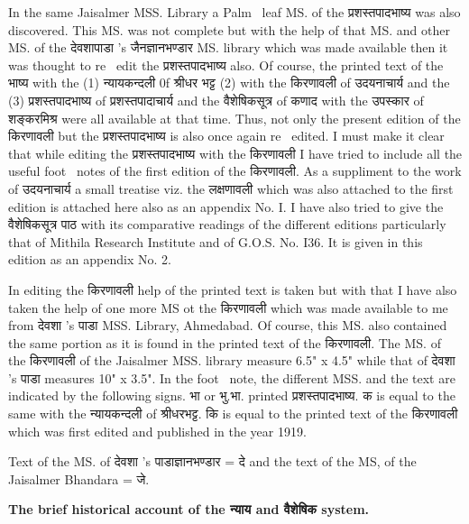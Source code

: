 \documentclass[11pt, openany]{book}
\begin{document}
In the same Jaisalmer MSS. Library a Palm \textendash\ leaf MS. of the प्रशस्तपादभाष्य was also discovered. This MS. was not complete but with the help of that MS. and other MS. of the देवशापाडा 's जैनज्ञानभण्डार MS. library which was made available then it was thought to re \textendash\ edit the प्रशस्तपादभाष्य also. Of course, the printed text of the भाष्य with the (1) न्यायकन्दली 0f श्रीधर भट्ट (2) with the किरणावली of उदयनाचार्य and the (3) प्रशस्तपादभाष्य of प्रशस्तपादाचार्य and the वैशेषिकसूत्र of कणाद with the उपस्कार of शङ्करमिश्र were all available at that time. Thus, not only the present edition of the किरणावली but the प्रशस्तपादभाष्य is also once again re \textendash\ edited. I must make it clear that while editing the प्रशस्तपादभाष्य with the किरणावली I have tried to include all the useful foot \textendash\ notes of the first edition of the किरणावली. As a suppliment to the work of उदयनाचार्य a small treatise viz. the लक्षणावली which was also attached to the first edition is attached here also as an appendix No. I. I have also tried to give the वैशेषिकसूत्र पाठ with its comparative readings of the different editions particularly that of Mithila Research Institute and of G.O.S. No. I36. It is given in this edition as an appendix No. 2.

In editing the किरणावली help of the printed text is taken but with that I have also taken the help of one more MS ot the किरणावली which was made available to me from देवशा 's पाडा MSS. Library, Ahmedabad. Of course, this MS. also contained the same portion as it is found in the printed text of the किरणावली. The MS. of the किरणावली of the Jaisalmer MSS. library measure 6.5" x 4.5" while that of देवशा 's पाडा measures 10" x 3.5". In the foot \textendash\ note, the different MSS. and the text are indicated by the following signs. भा or भु.भा. printed प्रशस्तपादभाष्य. क is equal to the same with the न्यायकन्दली of श्रीधरभट्ट. कि is equal to the printed text of the किरणावली which was first edited and published in the year 1919.

Text of the MS. of देवशा 's पाडाज्ञानभण्डार = दे and the text of the MS, of the Jaisalmer Bhandara = जे.

\newpage
\noindent
\textbf{The brief historical account of the न्याय and वैशेषिक system.}
\end{document}
